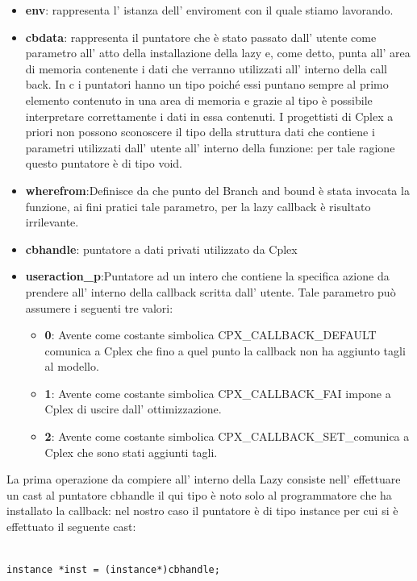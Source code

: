 \documentclass[11pt]{article}
\begin{document}
\begin{itemize}
	\item \textbf{env}: rappresenta l’ istanza dell’ enviroment  con il quale stiamo lavorando.
	\item \textbf{cbdata}: rappresenta il puntatore che è stato passato dall’ utente come parametro all’ atto della installazione della lazy e, come detto, punta all’ area di memoria contenente i dati che verranno utilizzati all’ interno della call back. In c i puntatori hanno un tipo poiché essi puntano sempre al primo elemento contenuto in una area di memoria e grazie al tipo è possibile interpretare correttamente i dati in essa contenuti. I progettisti di Cplex a priori non possono sconoscere il tipo della struttura dati che contiene i parametri utilizzati dall’ utente all’ interno della funzione: per tale ragione questo puntatore è di tipo void.
	\item \textbf{wherefrom}:Definisce da che punto del Branch and bound è stata invocata la funzione, ai fini pratici tale parametro, per la lazy callback è risultato irrilevante. 
	\item \textbf{cbhandle}: puntatore a dati privati utilizzato da Cplex
	\item \textbf{useraction\_p}:Puntatore ad un intero che contiene la specifica azione da prendere all’ interno della callback scritta dall’ utente. Tale parametro può assumere i seguenti tre valori:
	
	\begin{itemize}
	\item \textbf{0}: Avente come costante simbolica CPX\_CALLBACK\_DEFAULT comunica a Cplex che fino a quel punto la callback non ha aggiunto tagli al modello.
	\item \textbf{1}: Avente come costante simbolica CPX\_CALLBACK\_FAI impone a Cplex di uscire dall' ottimizzazione.
	\item \textbf{2}: Avente come costante simbolica CPX\_CALLBACK\_SET\_comunica a Cplex che sono stati aggiunti tagli.
	\end{itemize}

\end{itemize}


La prima operazione da compiere all' interno della Lazy consiste nell' effettuare un cast al puntatore cbhandle il qui tipo è noto solo al programmatore che ha installato la callback: nel nostro caso il puntatore è di tipo instance per cui si è effettuato il seguente cast:


\begin{lstlisting}

instance *inst = (instance*)cbhandle;

\end{lstlisting}
\end{document}

